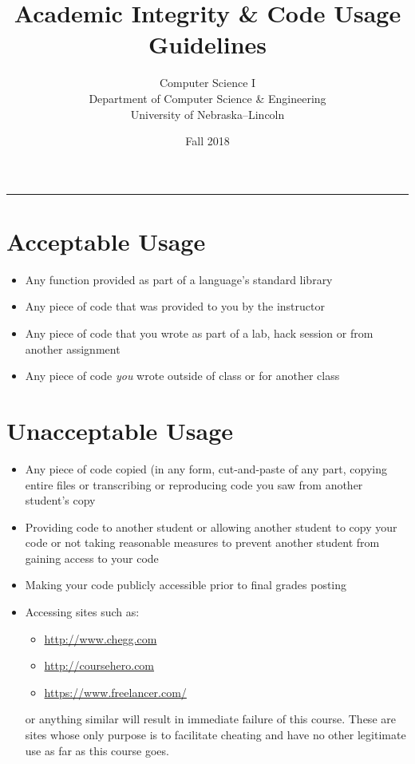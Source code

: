 \documentclass[12pt]{scrartcl}
\title{Academic Integrity \& Code Usage Guidelines}\let\Title\@title
\subtitle{Computer Science I\\
{\small
\vskip1cm
Department of Computer Science \& Engineering \\
University of Nebraska--Lincoln}
\vskip-1cm}
\date{Fall 2018}
\begin{document}
\maketitle

\hrule


\section*{Acceptable Usage}

\begin{itemize}
  \item Any function provided as part of a language's standard library
  \item Any piece of code that was provided to you by the instructor
  \item Any piece of code that you wrote as part of a lab, hack session or from another assignment
  \item Any piece of code \emph{you} wrote outside of class or for another class
\end{itemize}

\section*{Unacceptable Usage}

\begin{itemize}
  \item Any piece of code copied (in any form, cut-and-paste of any part, copying entire files or transcribing or reproducing code you saw from another student's copy
  \item Providing code to another student or allowing another student to copy your code or not taking reasonable measures to prevent another student from gaining access to your code
  \item Making your code publicly accessible prior to final grades posting
  \item Accessing sites such as:
  \begin{itemize}
    \item \url{http://www.chegg.com}
    \item \url{http://coursehero.com}
    \item \url{https://www.freelancer.com/} 
  \end{itemize}
  or anything similar will result in immediate failure of this course.  These
  are sites whose only purpose is to facilitate cheating and have no other 
  legitimate use as far as this course goes.
\end{itemize}
\end{document}
